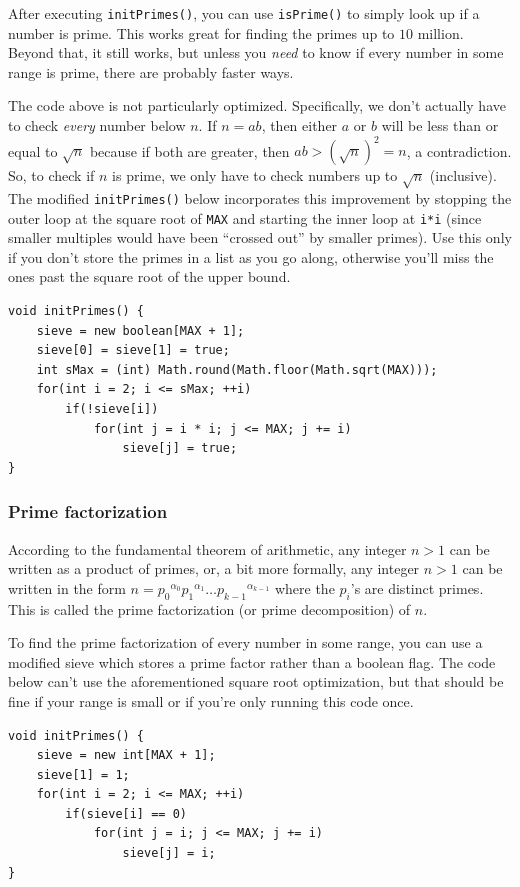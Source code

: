 \documentclass[a4paper,12pt]{article}
\begin{document}
\noindent After executing \lstinline/initPrimes()/, you can use \lstinline/isPrime()/ to simply look up if a number is prime. This works great for finding the primes up to $10$ million. Beyond that, it still works, but unless you {\em need} to know if every number in some range is prime, there are probably faster ways.

The code above is not particularly optimized. Specifically, we don't actually have to check {\em every} number below $n$. If $n=ab$, then either $a$ or $b$ will be less than or equal to $\sqrt{n}$ because if both are greater, then $ab>\left(\sqrt{n}\right)^2=n$, a contradiction. So, to check if $n$ is prime, we only have to check numbers up to $\sqrt{n}$ (inclusive). The modified \lstinline/initPrimes()/ below incorporates this improvement by stopping the outer loop at the square root of \lstinline/MAX/ and starting the inner loop at \lstinline/i*i/ (since smaller multiples would have been ``crossed out'' by smaller primes). Use this only if you don't store the primes in a list as you go along, otherwise you'll miss the ones past the square root of the upper bound.

\begin{lstlisting}
void initPrimes() {
	sieve = new boolean[MAX + 1];
	sieve[0] = sieve[1] = true;
	int sMax = (int) Math.round(Math.floor(Math.sqrt(MAX)));
	for(int i = 2; i <= sMax; ++i)
		if(!sieve[i])
			for(int j = i * i; j <= MAX; j += i)
				sieve[j] = true;
}
\end{lstlisting}

\subsubsection{Prime factorization}

According to the fundamental theorem of arithmetic, any integer $n>1$ can be written as a product of primes, or, a bit more formally, any integer $n>1$ can be written in the form $n={p_0}^{\alpha_0}{p_1}^{\alpha_1}\ldots{p_{k-1}}^{\alpha_{k-1}}$ where the $p_i$'s are distinct primes. This is called the prime factorization (or prime decomposition) of $n$.

To find the prime factorization of every number in some range, you can use a modified sieve which stores a prime factor rather than a boolean flag. The code below can't use the aforementioned square root optimization, but that should be fine if your range is small or if you're only running this code once.

\begin{lstlisting}
void initPrimes() {
	sieve = new int[MAX + 1];
	sieve[1] = 1;
	for(int i = 2; i <= MAX; ++i)
		if(sieve[i] == 0)
			for(int j = i; j <= MAX; j += i)
				sieve[j] = i;
}
\end{lstlisting}
\end{document}
